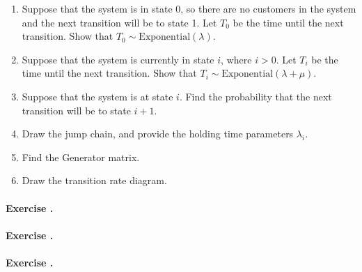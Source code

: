 \documentclass[twocolumn,12pt,a4paper]{article}
\newcounter{num}  %
\begin{document}
	\begin{enumerate}
		\item Suppose that the system is in state 0, so there are no customers in the system and the next transition will be to state 1. Let \( T_0 \) be the time until the next transition. Show that \( T_0 \sim \text{Exponential}(\lambda) \).
		
		\item Suppose that the system is currently in state \( i \), where \( i > 0 \). Let \( T_i \) be the time until the next transition. Show that \( T_i \sim \text{Exponential}(\lambda + \mu) \).
		
		\item Suppose that the system is at state \( i \). Find the probability that the next transition will be to state \( i + 1 \).
		
		\item Draw the jump chain, and provide the holding time parameters \( \lambda_i \).
		
		\item Find the Generator matrix.
		
		\item Draw the transition rate diagram.
	\end{enumerate}
	
	
	\paragraph{Exercise \thenum.}
	
	
	\paragraph{Exercise \thenum.}
	
	
	\paragraph{Exercise \thenum.}
	
	
\end{document}
